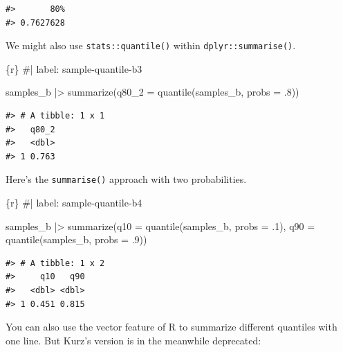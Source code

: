 \documentclass[
  letterpaper,
  DIV=11,
  numbers=noendperiod]{scrreprt}
\newenvironment{Shaded}{\begin{snugshade}}{\end{snugshade}}
\newcommand{\AttributeTok}[1]{\textcolor[rgb]{0.40,0.45,0.13}{#1}}
\newcommand{\CommentTok}[1]{\textcolor[rgb]{0.37,0.37,0.37}{#1}}
\newcommand{\DecValTok}[1]{\textcolor[rgb]{0.68,0.00,0.00}{#1}}
\newcommand{\FunctionTok}[1]{\textcolor[rgb]{0.28,0.35,0.67}{#1}}
\newcommand{\InformationTok}[1]{\textcolor[rgb]{0.37,0.37,0.37}{#1}}
\newcommand{\NormalTok}[1]{\textcolor[rgb]{0.00,0.23,0.31}{#1}}
\newcommand{\SpecialCharTok}[1]{\textcolor[rgb]{0.37,0.37,0.37}{#1}}
\begin{document}
\begin{verbatim}
#>       80% 
#> 0.7627628
\end{verbatim}

We might also use \texttt{stats::quantile()} within
\texttt{dplyr::summarise()}.

\begin{Shaded}
\begin{Highlighting}[]
\InformationTok{\textasciigrave{}\textasciigrave{}\textasciigrave{}\{r\}}
\CommentTok{\#| label: sample{-}quantile{-}b3}

\NormalTok{samples\_b }\SpecialCharTok{|\textgreater{}} 
    \FunctionTok{summarize}\NormalTok{(}\AttributeTok{q80\_2 =} \FunctionTok{quantile}\NormalTok{(samples\_b, }\AttributeTok{probs =}\NormalTok{ .}\DecValTok{8}\NormalTok{))}
\InformationTok{\textasciigrave{}\textasciigrave{}\textasciigrave{}}
\end{Highlighting}
\end{Shaded}

\begin{verbatim}
#> # A tibble: 1 x 1
#>   q80_2
#>   <dbl>
#> 1 0.763
\end{verbatim}

Here's the \texttt{summarise()} approach with two probabilities.

\begin{Shaded}
\begin{Highlighting}[]
\InformationTok{\textasciigrave{}\textasciigrave{}\textasciigrave{}\{r\}}
\CommentTok{\#| label: sample{-}quantile{-}b4}

\NormalTok{samples\_b }\SpecialCharTok{|\textgreater{}} 
    \FunctionTok{summarize}\NormalTok{(}\AttributeTok{q10 =} \FunctionTok{quantile}\NormalTok{(samples\_b, }\AttributeTok{probs =}\NormalTok{ .}\DecValTok{1}\NormalTok{),}
              \AttributeTok{q90 =} \FunctionTok{quantile}\NormalTok{(samples\_b, }\AttributeTok{probs =}\NormalTok{ .}\DecValTok{9}\NormalTok{))}
    
\InformationTok{\textasciigrave{}\textasciigrave{}\textasciigrave{}}
\end{Highlighting}
\end{Shaded}

\begin{verbatim}
#> # A tibble: 1 x 2
#>     q10   q90
#>   <dbl> <dbl>
#> 1 0.451 0.815
\end{verbatim}

You can also use the vector feature of R to summarize different
quantiles with one line. But Kurz's version is in the meanwhile
deprecated:
\end{document}
